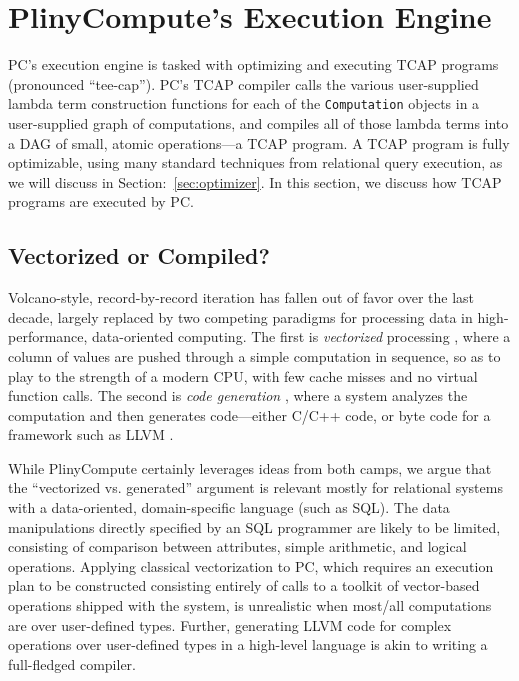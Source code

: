 \section{PlinyCompute's Execution Engine}
\label{sec:engine}
PC's execution engine is tasked with optimizing and executing TCAP programs (pronounced ``tee-cap'').  
PC's TCAP compiler
calls the various user-supplied lambda term construction functions for each of the \texttt{Computation} objects in a
user-supplied graph of computations,
and compiles all of those lambda terms into a DAG of small, atomic operations---a TCAP program.
A TCAP program is fully optimizable, using many standard techniques from relational query execution, as we
will discuss in Section:~\ref{sec:optimizer}.
In this section, we discuss how TCAP programs are executed by PC.

\subsection{Vectorized or Compiled?}
\label{sec:vectorized}

Volcano-style, record-by-record iteration \cite{graefe1990encapsulation} has fallen out of favor over the last decade, largely replaced by
two competing paradigms for processing data
in high-performance, data-oriented computing.  The first is \emph{vectorized} processing \cite{abadi2009column, boncz2005monetdb, zukowski2005monetdb, idreos2012monetdb}, where a column of values are pushed
through a simple computation in sequence, so as to play to the strength of a modern CPU, with few cache misses and no virtual
function calls.  The second is \emph{code generation} \cite{neumann2011efficiently, nagel2014code, bress2017generating, klonatos2014building, ahmad2009dbtoaster}, where a system analyzes the computation
and then generates code---either C/C++ code, or byte code for a framework such as LLVM \cite{lattner2004llvm, lattner2002llvm}.

While PlinyCompute certainly leverages ideas from both camps, we argue that the ``vectorized vs. generated'' argument is relevant mostly for 
relational systems with a data-oriented, domain-specific language (such as SQL).  
The data manipulations directly specified by an SQL programmer are likely to be limited, 
consisting of comparison between attributes, simple arithmetic, and logical operations.
Applying classical vectorization to PC,
which requires an execution plan to be constructed consisting entirely of calls to a toolkit of
vector-based operations shipped with the system, is
unrealistic when most/all computations are over user-defined
types. Further, generating LLVM code for complex operations over user-defined types 
in a high-level language 
is akin to writing a full-fledged compiler. 



